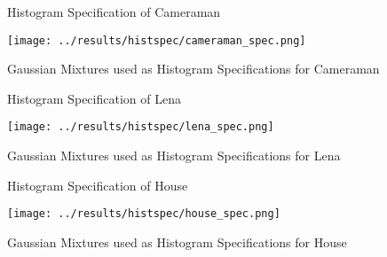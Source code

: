 \documentclass[journal]{IEEEtran}
\begin{document}
\begin{figure}[!h]
\centering
{}
\caption{Histogram Specification of Cameraman}
\label{histSpecCameraman}
\end{figure}

\begin{figure}[!h]
\centering
\texttt{[image: ../results/histspec/cameraman\_spec.png]}
\caption{Gaussian Mixtures used as Histogram Specifications for Cameraman}
\label{CameramanSpec}
\end{figure}


\begin{figure}[!h]
\centering
{}
\caption{Histogram Specification of Lena}
\label{histSpecLena}
\end{figure}

\begin{figure}[!h]
\centering
\texttt{[image: ../results/histspec/lena\_spec.png]}
\caption{Gaussian Mixtures used as Histogram Specifications for Lena}
\label{LenaSpec}
\end{figure}

\begin{figure}[!h]
\centering
{}
\caption{Histogram Specification of House}
\label{histSpecHouse}
\end{figure}


\begin{figure}[!h]
\centering
\texttt{[image: ../results/histspec/house\_spec.png]}
\caption{Gaussian Mixtures used as Histogram Specifications for House}
\label{HouseSpec}
\end{figure}
\end{document}
